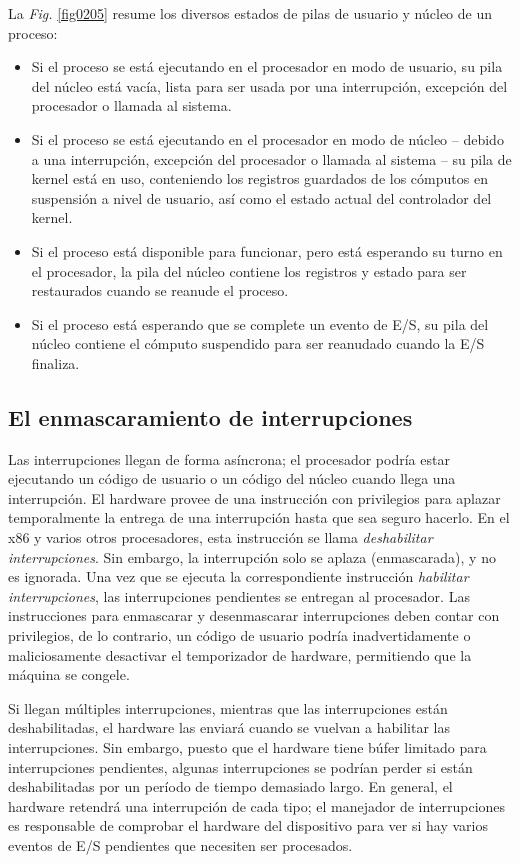 \documentclass[10pt]{book}
\begin{document}
La \textit{Fig.} \ref{fig0205} resume los diversos estados de pilas de usuario y núcleo de un proceso:
\begin{itemize}
\item Si el proceso se está ejecutando en el procesador en modo de usuario, su pila del núcleo está vacía, lista para ser usada por una interrupción, excepción del procesador o llamada al sistema.

\item Si el proceso se está ejecutando en el procesador en modo de núcleo -- debido a una interrupción, excepción del procesador o llamada al sistema -- su pila de kernel está en uso, conteniendo los registros guardados de los cómputos en suspensión a nivel de usuario, así como el estado actual del controlador del kernel.

\item Si el proceso está disponible para funcionar, pero está esperando su turno en el procesador, la pila del núcleo contiene los registros y estado para ser restaurados cuando se reanude el proceso.

\item Si el proceso está esperando que se complete un evento de E/S, su pila del núcleo contiene el cómputo suspendido para ser reanudado cuando la E/S finaliza.
\end{itemize}

\subsection{El enmascaramiento de interrupciones}
Las interrupciones llegan de forma asíncrona; el procesador podría estar ejecutando un código de usuario o un código del núcleo cuando llega una interrupción. El hardware provee de una instrucción con privilegios para aplazar temporalmente la entrega de una interrupción hasta que sea seguro hacerlo. En el {\mf x86} y varios otros procesadores, esta instrucción se llama \textit{deshabilitar interrupciones}. Sin embargo, la interrupción solo se aplaza (enmascarada), y no es ignorada. Una vez que se ejecuta la correspondiente instrucción \textit{habilitar interrupciones}, las interrupciones pendientes se entregan al procesador. Las instrucciones para enmascarar y desenmascarar interrupciones deben contar con privilegios, de lo contrario, un código de usuario podría inadvertidamente o maliciosamente desactivar el temporizador de hardware, permitiendo que la máquina se congele.

Si llegan múltiples interrupciones, mientras que las interrupciones están deshabilitadas, el hardware las enviará cuando se vuelvan a habilitar las interrupciones. Sin embargo, puesto que el hardware tiene búfer limitado para interrupciones pendientes, algunas interrupciones se podrían perder si están deshabilitadas por un período de tiempo demasiado largo. En general, el hardware retendrá una interrupción de cada tipo; el manejador de interrupciones es responsable de comprobar el hardware del dispositivo para ver si hay varios eventos de E/S pendientes que necesiten ser procesados.
\end{document}
